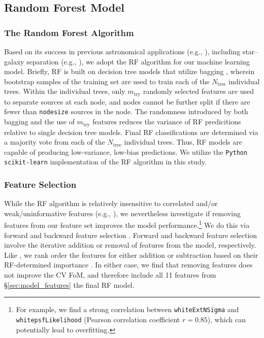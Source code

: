 \documentclass[twocolumn]{aastex62}
\begin{document}
\subsection{Random Forest Model}\label{sec:rf_model}

\subsubsection{The Random Forest Algorithm}\label{sec:rf_alg}

Based on its success in previous astronomical applications (e.g., \citealt{Richards12a, Huppenkothen17, Brink13, Wright15, Goldstein15}), including
star--galaxy separation (e.g., \citealt{Vasconcellos11,Miller17}), we adopt
the RF algorithm \citep{Breiman01} for our machine learning model. Briefly,
RF is built on decision tree models \citep{Quinlan93} that utilize bagging
\citep{Breiman96}, wherein bootstrap samples of the training set are used to
train each of the $N_{\mathrm{tree}}$ individual trees. Within the
individual trees, only $m_{\mathrm{try}}$ randomly selected features are
used to separate sources at each node, and nodes cannot be further split if
there are fewer than \texttt{nodesize} sources in the node. The randomness
introduced by both bagging and the use of $m_{\mathrm{try}}$ features
reduces the variance of RF predicitions relative to single decision tree
models. Final RF classifications are determined via a majority vote from
each of the $N_{\mathrm{tree}}$ individual trees. Thus, RF models are
capable of producing low-variance, low-bias predictions. We utilize the
\texttt{Python scikit-learn} implementation of the RF algorithm
\citep{Pedregosa12} in this study.

\subsubsection{Feature Selection}

While the RF algorithm is relatively insensitive to correlated and/or
weak/uninformative features (e.g., \citealt{Richards12a}), we nevertheless
investigate if removing features from our feature set improves the model
performance.\footnote{For example, we find a strong correlation between
\texttt{whiteExtNSigma} and \texttt{whitepsfLikelihood} (Pearson correlation
coefficient $r = 0.85$), which can potentially lead to overfitting.} We do
this via forward and backward feature selection \citep{Guyon03}. Forward and
backward feature selection involve the iterative addition or removal of
features from the model, respectively. Like \citet{Richards12a}, we rank
order the features for either addition or subtraction based on their
RF-determined importance \citep{Breiman02}. In either case, we find that
removing features does not improve the CV FoM, and therefore include all 11
features from \S\ref{sec:model_features} the final RF model.
\end{document}
